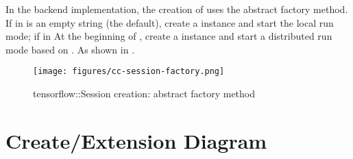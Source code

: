 \begin{content}
In the backend \cpp{} implementation, the creation of  uses the abstract factory method. If  in  is an empty string (the default), create a  instance and start the local run mode; if  in  At the beginning of , create a  instance and start a distributed run mode based on . As shown in .

\begin{figure}[H]
\centering
\texttt{[image: figures/cc-session-factory.png]}
\caption{tensorflow::Session creation: abstract factory method}
 \label{fig:cc-session-factory}
\end{figure}

\end{content}

\section{Create/Extension Diagram}

